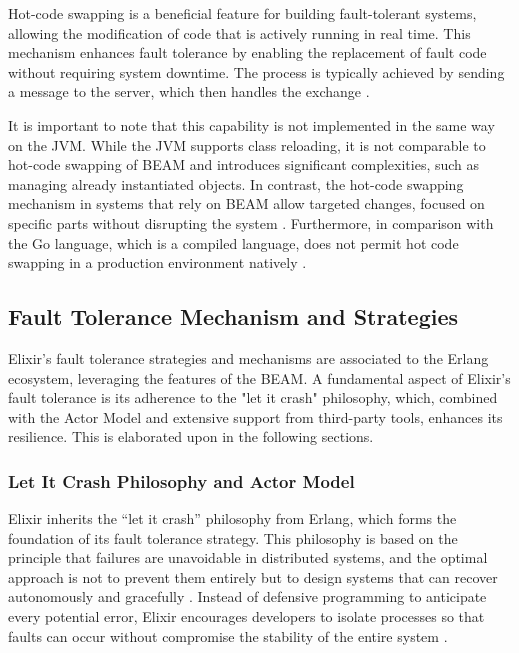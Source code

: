Hot-code swapping is a beneficial feature for building fault-tolerant systems, allowing the modification of code that is actively running in real time. This mechanism enhances fault tolerance by enabling the replacement of fault code without requiring system downtime. The process is typically achieved by sending a message to the server, which then handles the exchange \cite{Armstrong2013}.

It is important to note that this capability is not implemented in the same way on the \gls{JVM}. While the \gls{JVM} supports class reloading, it is not comparable to hot-code swapping of \gls{BEAM} and introduces significant complexities, such as managing already instantiated objects. In contrast, the hot-code swapping mechanism in systems that rely on \gls{BEAM} allow targeted changes, focused on specific parts without disrupting the system \cite{erlang-concurrency-blog}. Furthermore, in comparison with the Go language, which is a compiled language, does not permit hot code swapping in a production environment natively \cite{go-docs}.

\subsection{Fault Tolerance Mechanism and Strategies}

Elixir's fault tolerance strategies and mechanisms are associated to the Erlang ecosystem, leveraging the features of the \gls{BEAM}. A fundamental aspect of Elixir's fault tolerance is its adherence to the "let it crash" philosophy, which, combined with the Actor Model and extensive support from third-party tools, enhances its resilience. This is elaborated upon in the following sections.

\subsubsection{Let It Crash Philosophy and Actor Model}

Elixir inherits the “let it crash” philosophy from Erlang, which forms the foundation of its fault tolerance strategy. This philosophy is based on the principle that failures are unavoidable in distributed systems, and the optimal approach is not to prevent them entirely but to design systems that can recover autonomously and gracefully \cite{Armstrong2013, Kleppmann2017}. Instead of defensive programming to anticipate every potential error, Elixir encourages developers to isolate processes so that faults can occur without compromise the stability of the entire system \cite{Juric2024}.


